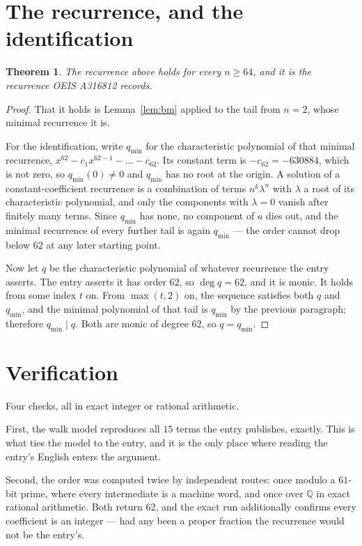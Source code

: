 \documentclass[11pt,a4paper]{article}
\theoremstyle{plain}
\newtheorem{theorem}{Theorem}
\theoremstyle{definition}
\begin{document}
\section{The recurrence, and the identification}

\begin{theorem}
The recurrence above holds for every $n\ge64$, and it is the recurrence OEIS A316812 records.
\end{theorem}

\begin{proof}
That it holds is Lemma~\ref{lem:bm} applied to the tail from $n=2$, whose minimal
recurrence it is.

For the identification, write $q_{\min}$ for the characteristic polynomial of that minimal
recurrence, $x^{62}-c_1x^{62-1}-\dots-c_{62}$. Its constant term is
$-c_{62}=-630884$, which is not zero, so $q_{\min}(0)\neq0$ and $q_{\min}$ has no
root at the origin. A solution of a constant-coefficient recurrence is a combination of terms
$n^{k}\lambda^{n}$ with $\lambda$ a root of its characteristic polynomial, and only the
components with $\lambda=0$ vanish after finitely many terms. Since $q_{\min}$ has none, no
component of $a$ dies out, and the minimal recurrence of every further tail is again
$q_{\min}$ --- the order cannot drop below $62$ at any later starting point.

Now let $q$ be the characteristic polynomial of whatever recurrence the entry asserts. The
entry asserts it has order $62$, so $\deg q=62$, and it is monic. It holds from some
index $t$ on. From $\max(t,2)$ on, the sequence satisfies both $q$ and $q_{\min}$, and
the minimal polynomial of that tail is $q_{\min}$ by the previous paragraph; therefore
$q_{\min}\mid q$. Both are monic of degree $62$, so $q=q_{\min}$.
\end{proof}

\section{Verification}

Four checks, all in exact integer or rational arithmetic.

First, the walk model reproduces all $15$ terms the entry publishes, exactly. This is
what ties the model to the entry, and it is the only place where reading the entry's English
enters the argument.

Second, the order was computed twice by independent routes: once modulo a $61$-bit prime, where
every intermediate is a machine word, and once over $\mathbb{Q}$ in exact rational arithmetic.
Both return $62$, and the exact run additionally confirms every coefficient is an integer
--- had any been a proper fraction the recurrence would not be the entry's.
\end{document}
